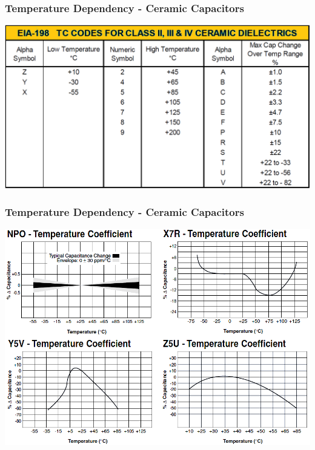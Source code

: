 \documentclass{beamer}
\begin{document}
	\begin{frame}
    \frametitle{Temperature Dependency - Ceramic Capacitors}
		\begin{center}
			\includegraphics[scale=0.3]{obr13_kodovani.png}
		\end{center}
  \end{frame}
	\begin{frame}
    \frametitle{Temperature Dependency - Ceramic Capacitors}
		\begin{center}
			\includegraphics[scale=0.4]{obr10_tepZav.png}
		\end{center}
  \end{frame}
\end{document}
